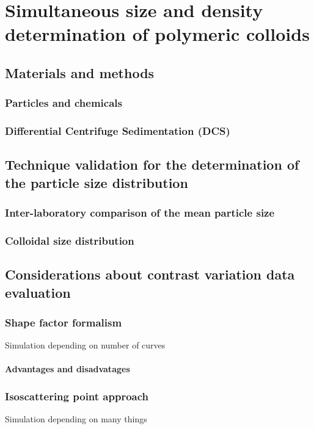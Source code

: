 \chapter{Simultaneous size and density determination of polymeric colloids}
\label{chap:simultaneous_size_density}
\blindtext[1]\cite{ballauff_saxs_2001-1}

\section{Materials and methods}
\subsection{Particles and chemicals}
\subsection{Differential Centrifuge Sedimentation (DCS)}

\section{Technique validation for the determination of the particle size distribution}
\subsection{Inter-laboratory comparison of the mean particle size}
\subsection{Colloidal size distribution}

\section{Considerations about contrast variation data evaluation}
\subsection{Shape factor formalism}
Simulation depending on number of curves
\subsubsection{Advantages and disadvatages}
\subsection{Isoscattering point approach}
Simulation depending on many things
